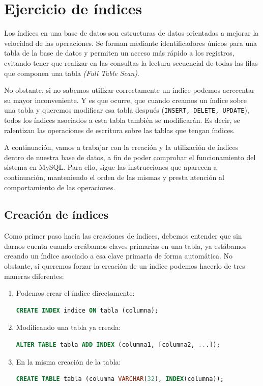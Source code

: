 \documentclass[a4paper]{article}
\begin{document}
\section*{Ejercicio de índices}

Los índices en una base de datos son estructuras de datos orientadas a mejorar la velocidad de las operaciones. Se forman mediante identificadores únicos para una tabla de la base de datos y permiten un acceso más rápido a los registros, evitando tener que realizar en las consultas la lectura secuencial de todas las filas que componen una tabla \textit{(Full Table Scan)}. 

No obstante, si no sabemos utilizar correctamente un índice podemos acrecentar su mayor inconveniente. Y es que ocurre, que cuando creamos un índice sobre una tabla y queremos modificar esa tabla después (\texttt{INSERT, DELETE, UPDATE}), todos los índices asociados a esta tabla también se modificarán. Es decir, se ralentizan las operaciones de escritura sobre las tablas que tengan índices. 

A continuación, vamos a trabajar con la creación y la utilización de índices dentro de nuestra base de datos, a fin de poder comprobar el funcionamiento del sistema en MySQL. Para ello, sigue las instrucciones que aparecen a continuación, manteniendo el orden de las mismas y presta atención al comportamiento de las operaciones. 

\subsection*{Creación de índices}

Como primer paso hacia las creaciones de índices, debemos entender que sin darnos cuenta cuando creábamos claves primarias en una tabla, ya estábamos creando un índice asociado a esa clave primaria de forma automática. No obstante, si queremos forzar la creación de un índice podemos hacerlo de tres maneras diferentes: 

\begin{enumerate}
    \item Podemos crear el índice directamente: 
    \begin{lstlisting}[language=SQL]
CREATE INDEX indice ON tabla (columna); 
    \end{lstlisting}
        
    \item Modificando una tabla ya creada: 
    \begin{lstlisting}[language=SQL]
ALTER TABLE tabla ADD INDEX (columna1, [columna2, ...]); 
    \end{lstlisting} 

     \item En la misma creación de la tabla: 
     \begin{lstlisting}[language=SQL]
CREATE TABLE tabla (columna VARCHAR(32), INDEX(columna)); 
     \end{lstlisting} 
\end{enumerate}
\end{document}
